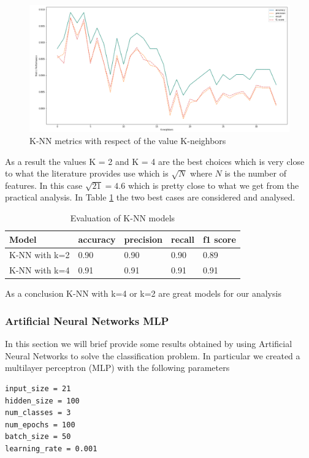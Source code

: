 \documentclass[a4paper,12pt]{article}
\begin{document}
\begin{figure}[H]
  \begin{center}
  \includegraphics[width=1.0\textwidth]{images/knn.png}
  \end{center}
  \caption{K-NN metrics with respect of the value K-neighbors}
  \label{fig:knn}
\end{figure}

\noindent As a result the values K = 2 and K = 4 are the best choices which is very close to what the literature provides use which is $\sqrt{N}$ where $N$ is the number of features. In this case $\sqrt{21} = 4.6$ which is pretty close to what we get from the practical analysis. In Table \ref{tab:knnres} the two best cases are considered and analysed.

\begin{table}[H]
\begin{tabular}{ |p{6cm}||p{2cm}|p{2cm}|p{2cm}|p{2cm}| }
  \hline
  Model& accuracy & precision  &  recall & f1 score \\
  \hline
  K-NN with k=2 &          0.90&   0.90&  0.90&  0.89\\
  K-NN with k=4   &          0.91&   0.91&  0.91&  0.91\\
  \hline
\end{tabular}
\caption{Evaluation of K-NN models}
\label{tab:knnres}
\end{table}

\noindent As a conclusion K-NN with k=4 or k=2 are great models for our analysis

\newpage
\subsubsection{Artificial Neural Networks MLP}
In this section we will brief provide some results obtained by using Artificial Neural Networks to solve the classification problem. In particular we created a multilayer perceptron (MLP) with the following parameters
\begin{Verbatim}[fontsize=\small]
input_size = 21
hidden_size = 100
num_classes = 3
num_epochs = 100
batch_size = 50
learning_rate = 0.001
\end{Verbatim} 
\end{document}
